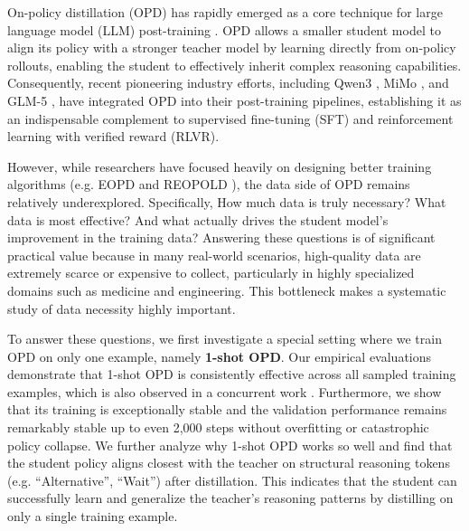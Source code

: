 On-policy distillation (OPD) has rapidly emerged as a core technique for large language model (LLM) post-training \citep{lu2025onpolicydistillation}. OPD allows a smaller student model to align its policy with a stronger teacher model by learning directly from on-policy rollouts, enabling the student to effectively inherit complex reasoning capabilities. Consequently, recent pioneering industry efforts, including Qwen3 \citep{yang2025qwen3}, MiMo \citep{xiao2026mimo}, and GLM-5 \citep{zeng2026glm}, have integrated OPD into their post-training pipelines, establishing it as an indispensable complement to supervised fine-tuning (SFT) and reinforcement learning with verified reward (RLVR).

However, while researchers have focused heavily on designing better training algorithms (e.g. EOPD \citep{jin2026entropy} and REOPOLD \citep{ko2026scaling}), the data side of OPD remains relatively underexplored. Specifically, How much data is truly necessary? What data is most effective? And what actually drives the student model's improvement in the training data? Answering these questions is of significant practical value because in many real-world scenarios, high-quality data are extremely scarce or expensive to collect, particularly in highly specialized domains such as medicine and engineering. This bottleneck makes a systematic study of data necessity highly important. 

To answer these questions, we first investigate a special setting where we train OPD on only one example, namely \textbf{1-shot OPD}. Our empirical evaluations demonstrate that 1-shot OPD is consistently effective across all sampled training examples, which is also observed in a concurrent work \citep{fu2026rethinking}. Furthermore, we show that its training is exceptionally stable and the validation performance remains remarkably stable up to even 2,000 steps without overfitting or catastrophic policy collapse. We further analyze why 1-shot OPD works so well and find that the student policy aligns closest with the teacher on structural reasoning tokens (e.g. ``Alternative'', ``Wait'') after distillation. This indicates that the student can successfully learn and generalize the teacher’s reasoning patterns by distilling on only a single training example.

